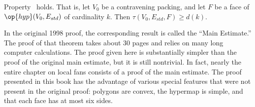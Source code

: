 


\begin{lemma}[]\label{lemma:main} 
Property~ holds.  That is,
let $V_0$ be a contravening packing, and  let $F$ be a
face of $\op{hyp}(V_0,E_{std})$ of cardinality $k$.  Then
$\tau(V_0,E_{std},F) \ge d(k)$.
\end{lemma}
%
%


\begin{remark}
  In the original 1998 proof, the corresponding result is called the
  ``Main Estimate.''  The proof of that theorem takes about 30 pages
  and relies on many long computer calculations.  The proof given here
  is substantially simpler than the proof of the original main
  estimate, but it is still nontrivial. In fact, nearly the entire
  chapter on local fans consists of a proof of the main estimate.
  The proof presented in this book has the advantage of various
  special features that were not present in the original proof:
  polygons are convex, the hypermap is simple, and that each face has
  at most six sides.
\end{remark}




